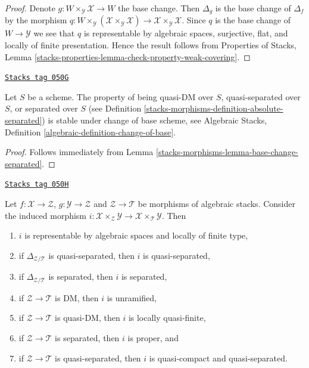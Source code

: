 \begin{proof}
Denote $g : W \times_\mathcal{Y} \mathcal{X} \to W$ the base change.
Then $\Delta_g$ is the base change of $\Delta_f$ by the morphism
$q : W \times_\mathcal{Y} (\mathcal{X} \times_\mathcal{Y} \mathcal{X})
\to \mathcal{X} \times_\mathcal{Y} \mathcal{X}$. Since $q$ is the base
change of $W \to \mathcal{Y}$ we see that $q$ is representable by algebraic
spaces, surjective, flat, and locally of finite presentation. Hence the
result follows from
Properties of Stacks, Lemma
\ref{stacks-properties-lemma-check-property-weak-covering}.
\end{proof}

\begin{lemma}
\label{stacks-morphisms-lemma-change-of-base-separated}
\href{https://stacks.math.columbia.edu/tag/050G}{\texttt{Stacks tag 050G}}

Let $S$ be a scheme. The property of being
quasi-DM over $S$, quasi-separated over $S$, or separated over $S$ (see
Definition \ref{stacks-morphisms-definition-absolute-separated})
is stable under change of base scheme, see
Algebraic Stacks, Definition \ref{algebraic-definition-change-of-base}.
\end{lemma}

\begin{proof}
Follows immediately from
Lemma \ref{stacks-morphisms-lemma-base-change-separated}.
\end{proof}

\begin{lemma}
\label{stacks-morphisms-lemma-fibre-product-after-map}
\href{https://stacks.math.columbia.edu/tag/050H}{\texttt{Stacks tag 050H}}

Let $f : \mathcal{X} \to \mathcal{Z}$, $g : \mathcal{Y} \to \mathcal{Z}$
and $\mathcal{Z} \to \mathcal{T}$ be morphisms of algebraic stacks.
Consider the induced morphism
$i : \mathcal{X} \times_\mathcal{Z} \mathcal{Y} \to
\mathcal{X} \times_\mathcal{T} \mathcal{Y}$.
Then
\begin{enumerate}
\item $i$ is representable by algebraic spaces and locally of finite type,
\item if $\Delta_{\mathcal{Z}/\mathcal{T}}$ is quasi-separated, then
$i$ is quasi-separated,
\item if $\Delta_{\mathcal{Z}/\mathcal{T}}$ is separated, then
$i$ is separated,
\item if $\mathcal{Z} \to \mathcal{T}$ is DM,
then $i$ is unramified,
\item if $\mathcal{Z} \to \mathcal{T}$ is quasi-DM,
then $i$ is locally quasi-finite,
\item if $\mathcal{Z} \to \mathcal{T}$ is separated, then $i$ is proper, and
\item if $\mathcal{Z} \to \mathcal{T}$ is quasi-separated, then
$i$ is quasi-compact and quasi-separated.
\end{enumerate}
\end{lemma}

